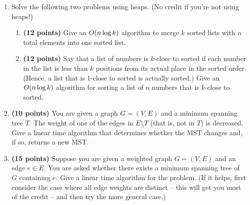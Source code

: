 \documentclass[10pt]{article}
\def\O{\mathop{\smash{O}}\nolimits}
\begin{document}
\begin{enumerate}
\item
Solve the following two problems using heaps.
(No credit if you're not using heaps!)  
\begin{enumerate}
\item
{\bf (12 points)}
Give an $\O(n \log k)$ algorithm to merge $k$ sorted lists with $n$ total elements into one sorted list.

\item
{\bf (12 points)}
Say that a list of numbers is $k$-close to
sorted if each number in the list is less than $k$ positions from its
actual place in the sorted order.  (Hence, a list that is 1-close to
sorted is actually sorted.)  Give an $\O(n \log k)$ algorithm for
sorting a list of $n$ numbers that is $k$-close to sorted.
\end{enumerate}

\item
{\bf (10 points)}
You are given a graph $G = (V,E)$ and a minimum spanning tree $T$.
The weight of one of the edges in $E \setminus T$ (that is, not in $T$) is decreased.  Give a linear
time algorithm that determines whether the MST changes and, if so, returns a new MST.

\item
{\bf (15 points)}
Suppose you are given a weighted graph $G = (V,E)$ and an edge
$e \in E$.  You are asked whether there exists a minimum spanning tree
of $G$ containing $e$.  Give a linear time algorithm for the problem.  
(If it helps, first consider the case where all edge weights are distinct -- this
will get you most of the credit -- and then try the more general
case.)


\end{enumerate}
\end{document}
